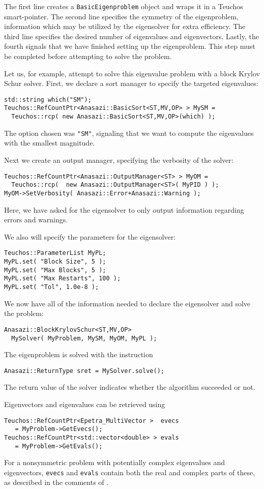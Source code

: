 The first line creates a \verb!BasicEigenproblem! object and wraps it
in a Teuchos smart-pointer. The second line specifies the symmetry of
the eigenproblem, information which may be utilized by the eigensolver
for extra efficiency. The third line specifies the desired number of
eigenvalues and eigenvectors. Lastly, the fourth signals that we have
finished setting up the eigenproblem. This step must be completed
before attempting to solve the problem.

Let us, for example, attempt to solve this eigenvalue problem with a
block Krylov Schur solver. First, we declare a sort manager to specify the
targeted eigenvalues:
\begin{verbatim}
std::string which("SM");
Teuchos::RefCountPtr<Anasazi::BasicSort<ST,MV,OP> > MySM =
  Teuchos::rcp( new Anasazi::BasicSort<ST,MV,OP>(which) );
\end{verbatim}
The option chosen was \verb!"SM"!, signaling that we want to compute
the eigenvalues with the smallest magnitude. 

Next we create an output manager, specifying the verbosity of the
solver:
\begin{verbatim}
Teuchos::RefCountPtr<Anasazi::OutputManager<ST> > MyOM = 
  Teuchos::rcp(  new Anasazi::OutputManager<ST>( MyPID ) );
MyOM->SetVerbosity( Anasazi::Error+Anasazi::Warning );
\end{verbatim}
Here, we have asked for the eigensolver to only output information regarding
errors and warnings.

We also will specify the parameters for the eigensolver:
\begin{verbatim}
Teuchos::ParameterList MyPL;
MyPL.set( "Block Size", 5 );
MyPL.set( "Max Blocks", 5 );
MyPL.set( "Max Restarts", 100 );
MyPL.set( "Tol", 1.0e-8 );
\end{verbatim}

We now have all of the information needed to declare the eigensolver
and solve the problem:
\begin{verbatim}
Anasazi::BlockKrylovSchur<ST,MV,OP> 
  MySolver( MyProblem, MySM, MyOM, MyPL );
\end{verbatim}
The eigenproblem is solved with the instruction
\begin{verbatim}
Anasazi::ReturnType sret = MySolver.solve();
\end{verbatim}
The return value of the solver indicates whether the algorithm
succeeded or not. 

Eigenvectors and eigenvalues can be retrieved using
\begin{verbatim}
Teuchos::RefCountPtr<Epetra_MultiVector >  evecs 
   = MyProblem->GetEvecs();
Teuchos::RefCountPtr<std::vector<double> > evals 
   = MyProblem->GetEvals();
\end{verbatim}
For a nonsymmetric problem with potentially complex eigenvalues and
eigenvectors, \verb!evecs! and \verb!evals! contain both the real and
complex parts of these, as described in the comments of
.

